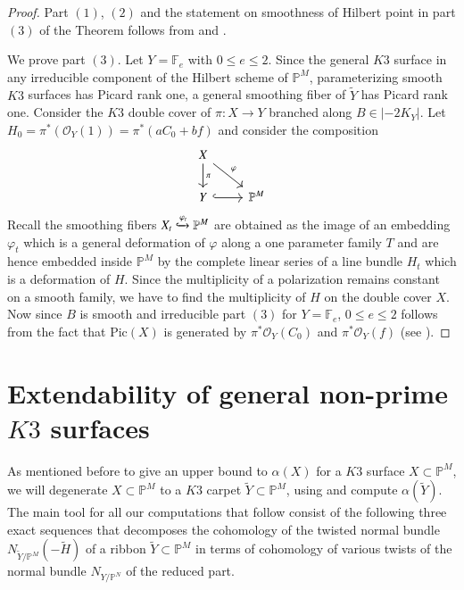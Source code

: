 \documentclass[11pt,twoside]{amsart}
\theoremstyle{plain}
\numberwithin{equation}{section}
\theoremstyle{definition}
\begin{document}
\begin{proof} Part $(1)$, $(2)$ and the statement on smoothness of Hilbert point in part $(3)$ of the Theorem follows from \cite[Theorem $3.1 (3)$, Theorem $4.3$, Theorem $5.1$]{BMR21} and \cite[Proposition $1.7$, Theorem $3.5$, Theorem $4.1$]{GP97}.
    

We prove part $(3)$. Let $Y = \mathbb{F}_e$ with $0 \leq e \leq 2$. Since the general $K3$ surface in any irreducible component of the Hilbert scheme of $\mathbb{P}^M$, parameterizing smooth $K3$ surfaces has Picard rank one, a general smoothing fiber of $\widetilde{Y}$ has Picard rank one. Consider the $K3$ double cover of $\pi:X \to Y$ branched along $B \in |-2K_Y|$. Let $H_0 = \pi^*(\mathcal{O}_{Y}(1)) = \pi^*(aC_0+bf)$ and consider the composition  
\[
\begin{tikzcd}
X \arrow[dr, "\varphi"] \arrow[d, "\pi"] & \\
Y \arrow[r, hook] & \mathbb{P}^M
\end{tikzcd}
\]
Recall the smoothing fibers $X_t \xhookrightarrow{\varphi_t} \mathbb{P}^M$ are obtained as the image of an embedding $\varphi_t$ which is a general deformation of $\varphi$ along a one parameter family $T$ and are hence embedded inside $\mathbb{P}^M$ by the complete linear series of a line bundle $H_t$ which is a deformation of $H$. Since the multiplicity of a polarization remains constant on a smooth family, we have to find the multiplicity of $H$ on the double cover $X$. Now since $B$ is smooth and irreducible part $(3)$ for $Y = \mathbb{F}_e$, $0 \leq e \leq 2$ follows from the fact that $\textrm{Pic}(X)$ is generated by $\pi^*\mathcal{O}_Y(C_0)$ and $\pi^*\mathcal{O}_Y(f)$ (see \cite[Proposition $6.3$]{AHL10}).

\end{proof}

\section{Extendability of general non-prime $K3$ surfaces}





As mentioned before to give an upper bound to $\alpha(X)$ for a $K3$ surface $X \subset \mathbb{P}^M$, we will degenerate $X \subset \mathbb{P}^M$ to a $K3$ carpet $\widetilde{Y} \subset \mathbb{P}^M$, using  and compute $\alpha(\widetilde{Y})$.  The main tool for all our computations that follow consist of the following three exact sequences that decomposes the cohomology of the twisted normal bundle $N_{\widetilde{Y}/\mathbb{P}^M}(-\widetilde{H})$ of a ribbon $\widetilde{Y} \subset \mathbb{P}^M$ in terms of cohomology of various twists of the normal bundle $N_{Y/\mathbb{P}^N}$ of the reduced part. 
\end{document}
